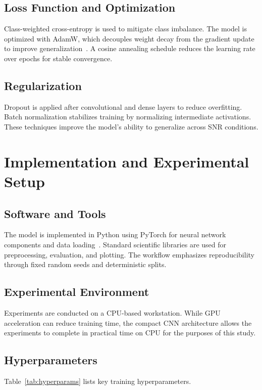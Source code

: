 \documentclass[12pt,a4paper]{report}
\begin{document}
\section{Loss Function and Optimization}
Class-weighted cross-entropy is used to mitigate class imbalance. The model is optimized with AdamW, which decouples weight decay from the gradient update to improve generalization~\cite{loshchilov2019adamw}. A cosine annealing schedule reduces the learning rate over epochs for stable convergence.

\section{Regularization}
Dropout is applied after convolutional and dense layers to reduce overfitting. Batch normalization stabilizes training by normalizing intermediate activations. These techniques improve the model’s ability to generalize across SNR conditions.

\chapter{Implementation and Experimental Setup}
\section{Software and Tools}
The model is implemented in Python using PyTorch for neural network components and data loading~\cite{pytorchdocs}. Standard scientific libraries are used for preprocessing, evaluation, and plotting. The workflow emphasizes reproducibility through fixed random seeds and deterministic splits.

\section{Experimental Environment}
Experiments are conducted on a CPU-based workstation. While GPU acceleration can reduce training time, the compact CNN architecture allows the experiments to complete in practical time on CPU for the purposes of this study.

\section{Hyperparameters}
Table~\ref{tab:hyperparams} lists key training hyperparameters.
\end{document}
